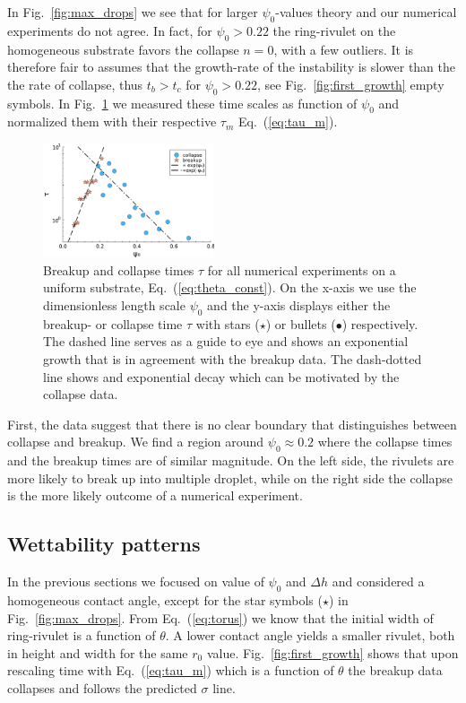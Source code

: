 \documentclass[twoside,twocolumn,9pt]{article}
\begin{document}
In Fig.~\ref{fig:max_drops} we see that for larger $\psi_0$-values theory and our numerical experiments do not agree.
In fact, for $\psi_0 > 0.22$ the ring-rivulet on the homogeneous substrate favors the collapse $n = 0$, with a few outliers. 
It is therefore fair to assumes that the growth-rate of the instability is slower than the the rate of collapse, thus $t_b > t_c$ for $\psi_0 > 0.22$, see Fig.~\ref{fig:first_growth} empty symbols.
In Fig.~\ref{fig:timescaleDifference} we measured these time scales as function of $\psi_0$ and normalized them with their respective $\tau_m$ Eq.~(\ref{eq:tau_m}).
\begin{figure}
    \centering
    \includegraphics[width = 0.45\textwidth]{assets/uniform_timescales.pdf}
    \caption{Breakup and collapse times $\tau$ for all numerical experiments on a uniform substrate, Eq.~(\ref{eq:theta_const}).
        On the x-axis we use the dimensionless length scale $\psi_0$ and the y-axis displays either the breakup- or collapse time $\tau$ with stars (\textcolor{jlorange}{$\star$}) or bullets (\textcolor{jlblue}{$\bullet$}) respectively.
        The dashed line serves as a guide to eye and shows an exponential growth that is in agreement with the breakup data. 
        The dash-dotted line shows and exponential decay which can be motivated by the collapse data.
        }
    \label{fig:timescaleDifference}
\end{figure}
First, the data suggest that there is no clear boundary that distinguishes between collapse and breakup.
We find a region around $\psi_0 \approx 0.2$ where the collapse times and the breakup times are of similar magnitude.
On the left side, the rivulets are more likely to break up into multiple droplet, while on the right side the collapse is the more likely outcome of a numerical experiment.

\subsection{Wettability patterns}\label{subsec:wettability}
In the previous sections we focused on value of $\psi_0$ and $\Delta h$ and considered a homogeneous contact angle, except for the star symbols (\textcolor{jlorange}{$\star$}) in Fig.~\ref{fig:max_drops}.
From Eq.~(\ref{eq:torus}) we know that the initial width of ring-rivulet is a function of $\theta$.
A lower contact angle yields a smaller rivulet, both in height and width for the same $r_0$ value.
Fig.~\ref{fig:first_growth} shows that upon rescaling time with Eq.~(\ref{eq:tau_m}) which is a function of $\theta$ the breakup data collapses and follows the predicted $\sigma$ line. 
\end{document}
